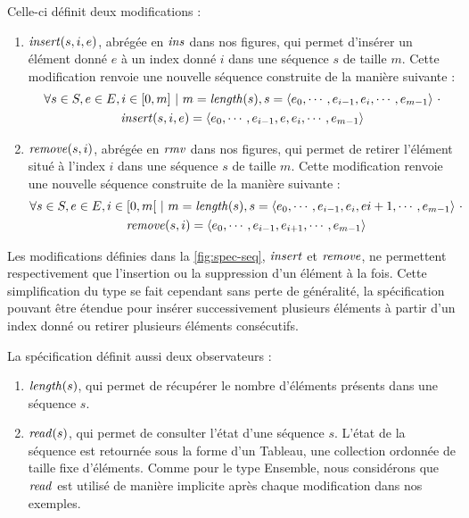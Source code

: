 Celle-ci définit deux modifications :
\begin{enumerate}
  \item $\mathit{insert}(s,i,e)$, abrégée en $\mathit{ins}$ dans nos figures, qui permet d'insérer un élément donné $e$ à un index donné $i$ dans une séquence $s$ de taille $m$.
    Cette modification renvoie une nouvelle séquence construite de la manière suivante :
    \begin{multline*}
      \forall s \in S, e \in E, i \in [0,m]~|~m = \mathit{length}(s),
      s = \langle e_0, \cdots, e_{i-1}, e_{i}, \cdots, e_{m-1} \rangle~\cdot \\
      \mathit{insert}(s,i,e) = \langle e_0, \cdots, e_{i-1}, e, e_{i}, \cdots, e_{m-1}  \rangle
    \end{multline*}
  \item $\mathit{remove}(s,i)$, abrégée en $\mathit{rmv}$ dans nos figures, qui permet de retirer l'élément situé à l'index $i$ dans une séquence $s$ de taille $m$.
    Cette modification renvoie une nouvelle séquence construite de la manière suivante :
    \begin{multline*}
      \forall s \in S, e \in E, i \in [0,m[~|~m = \mathit{length}(s),
      s = \langle e_0, \cdots, e_{i-1}, e_{i}, e{i+1}, \cdots, e_{m-1} \rangle~\cdot \\
      \mathit{remove}(s,i) = \langle e_0, \cdots, e_{i-1}, e_{i+1}, \cdots, e_{m-1}  \rangle
    \end{multline*}
\end{enumerate}
Les modifications définies dans la \autoref{fig:spec-seq}, $\mathit{insert}$ et $\mathit{remove}$, ne permettent respectivement que l'insertion ou la suppression d'un élément à la fois.
Cette simplification du type se fait cependant sans perte de généralité, la spécification pouvant être étendue pour insérer successivement plusieurs éléments à partir d'un index donné ou retirer plusieurs éléments consécutifs.

La spécification définit aussi deux observateurs :
\begin{enumerate}
  \item $\mathit{length}(s)$, qui permet de récupérer le nombre d'éléments présents dans une séquence $s$.
  \item $\mathit{read}(s)$, qui permet de consulter l'état d'une séquence $s$.
    L'état de la séquence est retournée sous la forme d'un Tableau, \ie une collection ordonnée de taille fixe d'éléments.
    Comme pour le type Ensemble, nous considérons que $\mathit{read}$ est utilisé de manière implicite après chaque modification dans nos exemples.
\end{enumerate}

